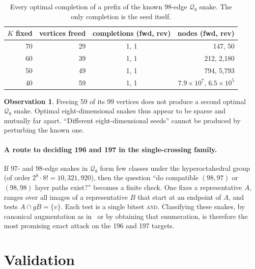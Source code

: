 \documentclass[11pt,a4paper]{article}
\theoremstyle{definition}
\newtheorem{observation}[theorem]{Observation}
\newcommand{\Q}{\mathcal{Q}}
\begin{document}
\begin{table}[ht]
\centering\small
\begin{tabular}{rrcr}
\toprule
$K$ fixed & vertices freed & completions (fwd, rev) & nodes (fwd, rev)\\
\midrule
70 & 29 & 1, 1 & 147, 50\\
60 & 39 & 1, 1 & 212, 2{,}180\\
50 & 49 & 1, 1 & 794, 5{,}793\\
40 & 59 & 1, 1 & $7.9\times10^{7}$, $6.5\times10^{5}$\\
\bottomrule
\end{tabular}
\caption{Every optimal completion of a prefix of the known 98-edge $\Q_8$ snake. The only completion is the seed itself.}
\end{table}

\begin{observation}
Freeing 59 of its 99 vertices does not produce a second optimal $\Q_8$ snake. Optimal eight-dimensional snakes thus appear to be sparse and mutually far apart. ``Different eight-dimensional seeds'' cannot be produced by perturbing the known one.
\end{observation}

\paragraph{A route to deciding 196 and 197 in the single-crossing family.} If 97- and 98-edge snakes in $\Q_8$ form few classes under the hyperoctahedral group (of order $2^8\cdot8!=10{,}321{,}920$), then the question ``do compatible $(98,97)$ or $(98,98)$ layer paths exist?'' becomes a finite check. One fixes a representative $A$, ranges over all images of a representative $B$ that start at an endpoint of $A$, and tests $A\cap gB=\{v\}$. Each test is a single bitset \textsc{and}. Classifying these snakes, by canonical augmentation as in~\cite{ostergard} or by obtaining that enumeration, is therefore the most promising exact attack on the 196 and 197 targets.

\section{Validation}\label{sec:valid}
\end{document}
